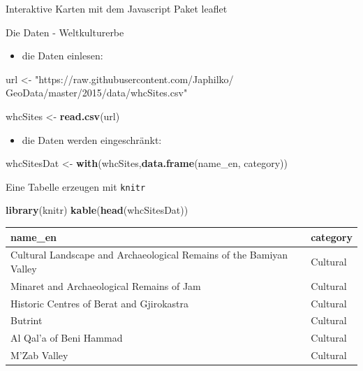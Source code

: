 \documentclass[ignorenonframetext,]{beamer}
\newenvironment{Shaded}{}{}
\newcommand{\KeywordTok}[1]{\textcolor[rgb]{0.00,0.44,0.13}{\textbf{{#1}}}}
\newcommand{\StringTok}[1]{\textcolor[rgb]{0.25,0.44,0.63}{{#1}}}
\newcommand{\NormalTok}[1]{{#1}}
\providecommand{\tightlist}{%
\setlength{\itemsep}{0pt}\setlength{\parskip}{0pt}}
\begin{document}
\begin{frame}[fragile]{Interaktive Karten mit dem Javascript Paket
leaflet}

\begin{block}{Die Daten - Weltkulturerbe}

\begin{itemize}
\tightlist
\item
  die Daten einlesen:
\end{itemize}

\begin{Shaded}
\begin{Highlighting}[]
\NormalTok{url <-}\StringTok{ "https://raw.githubusercontent.com/Japhilko/}
\StringTok{GeoData/master/2015/data/whcSites.csv"}

\NormalTok{whcSites <-}\StringTok{ }\KeywordTok{read.csv}\NormalTok{(url) }
\end{Highlighting}
\end{Shaded}

\begin{itemize}
\tightlist
\item
  die Daten werden eingeschränkt:
\end{itemize}

\begin{Shaded}
\begin{Highlighting}[]
\NormalTok{whcSitesDat <-}\StringTok{ }\KeywordTok{with}\NormalTok{(whcSites,}\KeywordTok{data.frame}\NormalTok{(name_en,}
                                        \NormalTok{category))}
\end{Highlighting}
\end{Shaded}

\end{block}

\begin{block}{Eine Tabelle erzeugen mit \texttt{knitr}}

\begin{Shaded}
\begin{Highlighting}[]
\KeywordTok{library}\NormalTok{(knitr)}
\KeywordTok{kable}\NormalTok{(}\KeywordTok{head}\NormalTok{(whcSitesDat))}
\end{Highlighting}
\end{Shaded}

\begin{longtable}[]{@{}ll@{}}
\toprule
name\_en & category\tabularnewline
\midrule
\endhead
Cultural Landscape and Archaeological Remains of the Bamiyan Valley &
Cultural\tabularnewline
Minaret and Archaeological Remains of Jam & Cultural\tabularnewline
Historic Centres of Berat and Gjirokastra & Cultural\tabularnewline
Butrint & Cultural\tabularnewline
Al Qal'a of Beni Hammad & Cultural\tabularnewline
M'Zab Valley & Cultural\tabularnewline
\bottomrule
\end{longtable}


\end{block}
\end{frame}
\end{document}
